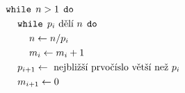 \documentclass[preview]{standalone}
\begin{document}
\begin{align*}
&\mathtt{while} \:\: n > 1 \:\: \mathtt{do}\\&\hspace*{12pt}\mathtt{while} \:\: p_i \text{ dělí } n \:\: \mathtt{do}\\&\hspace*{24pt}n \leftarrow n / p_i\\&\hspace*{24pt}m_i \leftarrow m_i + 1\\&\hspace*{12pt}p_{i+1} \leftarrow \text{ nejbližší prvočíslo větší než } p_i\\&\hspace*{12pt}m_{i+1} \leftarrow 0
\end{align*}
\end{document}
